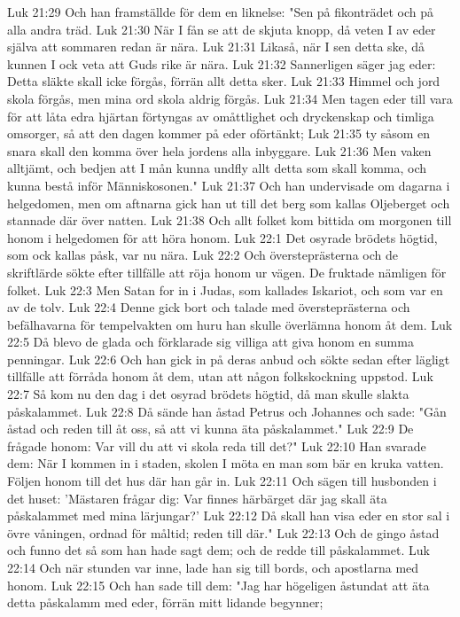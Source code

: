 Luk 21:29  Och han framställde för dem en liknelse: "Sen på fikonträdet och på alla andra träd.
Luk 21:30  När I fån se att de skjuta knopp, då veten I av eder själva att sommaren redan är nära.
Luk 21:31  Likaså, när I sen detta ske, då kunnen I ock veta att Guds rike är nära.
Luk 21:32  Sannerligen säger jag eder: Detta släkte skall icke förgås, förrän allt detta sker.
Luk 21:33  Himmel och jord skola förgås, men mina ord skola aldrig förgås.
Luk 21:34  Men tagen eder till vara för att låta edra hjärtan förtyngas av omåttlighet och dryckenskap och timliga omsorger, så att den dagen kommer på eder oförtänkt;
Luk 21:35  ty såsom en snara skall den komma över hela jordens alla inbyggare.
Luk 21:36  Men vaken alltjämt, och bedjen att I mån kunna undfly allt detta som skall komma, och kunna bestå inför Människosonen."
Luk 21:37  Och han undervisade om dagarna i helgedomen, men om aftnarna gick han ut till det berg som kallas Oljeberget och stannade där över natten.
Luk 21:38  Och allt folket kom bittida om morgonen till honom i helgedomen för att höra honom.
Luk 22:1  Det osyrade brödets högtid, som ock kallas påsk, var nu nära.
Luk 22:2  Och översteprästerna och de skriftlärde sökte efter tillfälle att röja honom ur vägen. De fruktade nämligen för folket.
Luk 22:3  Men Satan for in i Judas, som kallades Iskariot, och som var en av de tolv.
Luk 22:4  Denne gick bort och talade med översteprästerna och befälhavarna för tempelvakten om huru han skulle överlämna honom åt dem.
Luk 22:5  Då blevo de glada och förklarade sig villiga att giva honom en summa penningar.
Luk 22:6  Och han gick in på deras anbud och sökte sedan efter lägligt tillfälle att förråda honom åt dem, utan att någon folkskockning uppstod.
Luk 22:7  Så kom nu den dag i det osyrad brödets högtid, då man skulle slakta påskalammet.
Luk 22:8  Då sände han åstad Petrus och Johannes och sade: "Gån åstad och reden till åt oss, så att vi kunna äta påskalammet."
Luk 22:9  De frågade honom: Var vill du att vi skola reda till det?"
Luk 22:10  Han svarade dem: När I kommen in i staden, skolen I möta en man som bär en kruka vatten. Följen honom till det hus där han går in.
Luk 22:11  Och sägen till husbonden i det huset: 'Mästaren frågar dig: Var finnes härbärget där jag skall äta påskalammet med mina lärjungar?'
Luk 22:12  Då skall han visa eder en stor sal i övre våningen, ordnad för måltid; reden till där."
Luk 22:13  Och de gingo åstad och funno det så som han hade sagt dem; och de redde till påskalammet.
Luk 22:14  Och när stunden var inne, lade han sig till bords, och apostlarna med honom.
Luk 22:15  Och han sade till dem: "Jag har högeligen åstundat att äta detta påskalamm med eder, förrän mitt lidande begynner;
